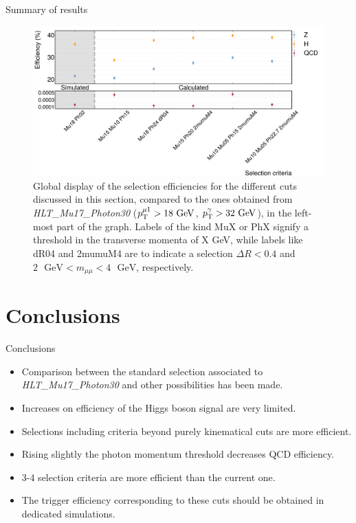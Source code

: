 \documentclass[aspectratio = 1610, xcolor = dvipsnames]{beamer}
\newcommand{\GeV}{\textrm{ }\mathrm{GeV}}
\newcommand{\pt}{p_{\rm T}}
\newcommand{\red}{\textcolor{unipd}}
\begin{document}

    \begin{frame}[t]{Summary of results}
        
        \begin{figure}[c]
            \centering
            \includegraphics[width=1\textwidth]{images/eff_comparison.pdf}
            \caption{Global display of the selection efficiencies for the different cuts discussed in this section, compared to the ones obtained from {\it HLT\_Mu17\_Photon30} ($\pt^{\mu 1} > 18\GeV$, $\pt^{\gamma} > 32\GeV$), in the left-most part of the graph. Labels of the kind MuX or PhX signify a threshold in the transverse momenta of X GeV, while labels like dR04 and 2mumuM4 are to indicate a selection $\Delta R < 0.4$ and $2\GeV < m_{\mu\mu} < 4\GeV$, respectively.
            \label{im:eff_comparison}}
        \end{figure}

    \end{frame}


    \section{Conclusions}
    
    \begin{frame}[t]{Conclusions}

        \begin{itemize}
            \item \red{Comparison} between the standard selection associated to {\it HLT\_Mu17\_Photon30} and other possibilities has been made.
            \item Increases on efficiency of the Higgs boson signal are \red{very limited}.
            \item Selections including criteria beyond purely kinematical cuts are more efficient.
            \item Rising slightly the photon momentum threshold decreases QCD efficiency. 
            \item 3-4 selection criteria are more efficient than the current one.
            \item The trigger efficiency corresponding to these cuts should be obtained in dedicated simulations.
        \end{itemize}

    \end{frame}
\end{document}
